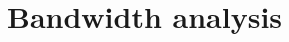 \documentclass[IN,11pt,twoside,openright,idp,english]{tumthesis}
\begin{document}
\section{Bandwidth analysis}









\end{document}
